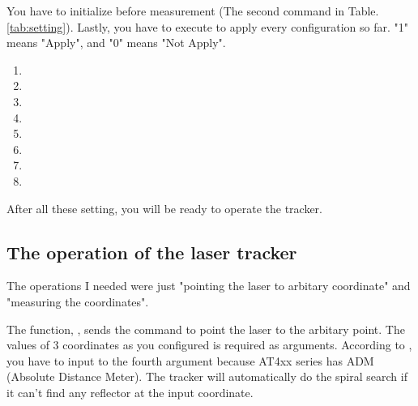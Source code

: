 \documentclass[a4paper,12pt]{article}  %
\begin{document}
You have to initialize before measurement (The second command in Table.\ref{tab:setting}).
Lastly, you have to execute  to apply every configuration so far.
"1" means "Apply", and "0" means "Not Apply".  
\begin{center}
\begin{minipage}{0.5\textwidth}  %
  \centering
  \label{tab:setting}
  \begin{enumerate}
    \item {}
    \item {}
    \item {}
    \item {}
    \item {}
    \item {}
    \item {}
    \item {}
  \end{enumerate}
\end{minipage}
\end{center}
After all these setting, you will be ready to operate the tracker.

\subsection{The operation of the laser tracker}
The operations I needed were just "pointing the laser to arbitary coordinate" and "measuring the coordinates".

The function, , sends the command to point the laser to the arbitary point.
The values of 3 coordinates as you configured is required as arguments.
According to , you have to input  to the fourth argument  because AT4xx series has ADM (Absolute Distance Meter).
The tracker will automatically do the spiral search if it can't find any reflector at the input coordinate.
\end{document}
